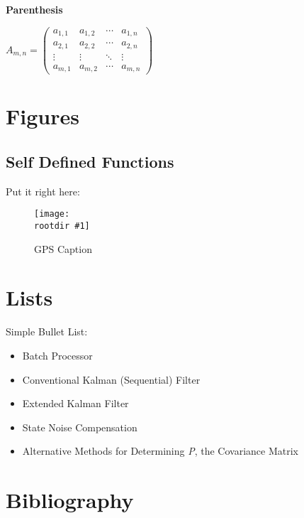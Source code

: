 \documentclass[11pt,a4paper,oneside]{article}
\newcommand{\rootdir}{./Figures/}
\newcommand{\fig}[3]{
			\begin{center}
				\begin{figure}[H]
					\texttt{[image: \\rootdir \#1]}
					\caption{#2}
					\label{#3}
				\end{figure}
			\end{center}
			}
\begin{document}
\noindent \bf{Parenthesis}
	\begin{center}
	$
		A_{m,n} =
		 \begin{pmatrix}
		  a_{1,1} & a_{1,2} & \cdots & a_{1,n} \\
		  a_{2,1} & a_{2,2} & \cdots & a_{2,n} \\
		  \vdots  & \vdots  & \ddots & \vdots  \\
		  a_{m,1} & a_{m,2} & \cdots & a_{m,n}
		 \end{pmatrix}
	$
\end{center}



\section{Figures}
\subsection{Self Defined Functions}
Put it right here:
\fig{GPS.jpg}{GPS Caption \cite{GPS}}{GPS Label}



\section{Lists}
Simple Bullet List:
\begin{itemize}
	\renewcommand{\labelitemi}{$\bullet$}
	\item Batch Processor
	\item Conventional Kalman (Sequential) Filter
	\item Extended Kalman Filter
	\item State Noise Compensation
	\item Alternative Methods for Determining \emph{P}, the Covariance Matrix
\end{itemize}




\newpage
\section{Bibliography}
\end{document}
